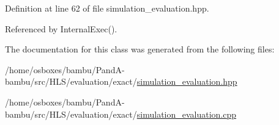 Definition at line 62 of file simulation\+\_\+evaluation.\+hpp.



Referenced by Internal\+Exec().



The documentation for this class was generated from the following files\+:\begin{DoxyCompactItemize}
\item 
/home/osboxes/bambu/\+Pand\+A-\/bambu/src/\+H\+L\+S/evaluation/exact/\hyperlink{simulation__evaluation_8hpp}{simulation\+\_\+evaluation.\+hpp}\item 
/home/osboxes/bambu/\+Pand\+A-\/bambu/src/\+H\+L\+S/evaluation/exact/\hyperlink{simulation__evaluation_8cpp}{simulation\+\_\+evaluation.\+cpp}\end{DoxyCompactItemize}
